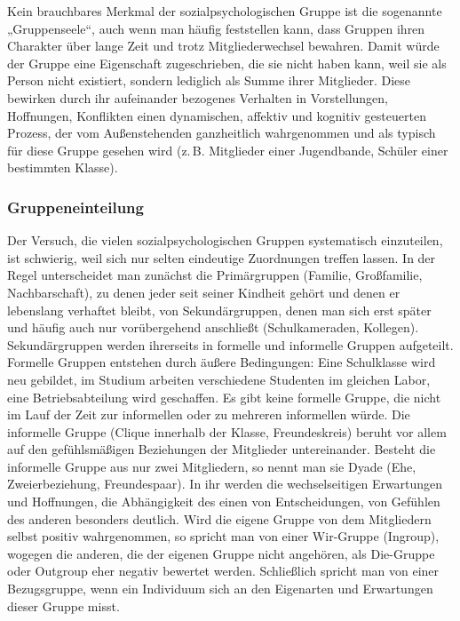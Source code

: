 \documentclass[12pt]{scrartcl}
\DeclareRobustCommand{\zB}{z.\,B.\xspace}
\begin{document}
Kein brauchbares Merkmal der sozialpsychologischen Gruppe ist die sogenannte
„Gruppenseele“, auch wenn man häufig feststellen kann, dass Gruppen ihren
Charakter über lange Zeit und trotz Mitgliederwechsel bewahren. Damit würde der
Gruppe eine Eigenschaft zugeschrieben, die sie nicht haben kann, weil sie als
Person nicht existiert, sondern lediglich als Summe ihrer Mitglieder. Diese
bewirken durch ihr aufeinander bezogenes Verhalten in Vorstellungen,
Hoffnungen, Konflikten einen dynamischen, affektiv und kognitiv gesteuerten
Prozess, der vom Außenstehenden ganzheitlich wahrgenommen und als typisch für
diese Gruppe gesehen wird (\zB Mitglieder einer Jugendbande, Schüler einer
bestimmten Klasse).

\subsubsection{Gruppeneinteilung}
Der Versuch, die vielen sozialpsychologischen Gruppen systematisch einzuteilen,
ist schwierig, weil sich nur selten eindeutige Zuordnungen treffen lassen. In
der Regel unterscheidet man zunächst die Primärgruppen (Familie, Großfamilie,
Nachbarschaft), zu denen jeder seit seiner Kindheit gehört und denen er
lebenslang verhaftet bleibt, von Sekundärgruppen, denen man sich erst später
und häufig auch nur vorübergehend anschließt (Schulkameraden, Kollegen).
Sekundärgruppen werden ihrerseits in formelle und informelle Gruppen
aufgeteilt. Formelle Gruppen entstehen durch äußere Bedingungen: Eine
Schulklasse wird neu gebildet, im Studium arbeiten verschiedene Studenten im
gleichen Labor, eine Betriebsabteilung wird geschaffen. Es gibt keine formelle
Gruppe, die nicht im Lauf der Zeit zur informellen oder zu mehreren informellen
würde. Die informelle Gruppe (Clique innerhalb der Klasse, Freundeskreis)
beruht vor allem auf den gefühlsmäßigen Beziehungen der Mitglieder
untereinander. Besteht die informelle Gruppe aus nur zwei Mitgliedern, so nennt
man sie Dyade (Ehe, Zweierbeziehung, Freundespaar). In ihr werden die
wechselseitigen Erwartungen und Hoffnungen, die Abhängigkeit des einen von
Entscheidungen, von Gefühlen des anderen besonders deutlich. Wird die eigene
Gruppe von dem Mitgliedern selbst positiv wahrgenommen, so spricht man von
einer Wir-Gruppe (Ingroup), wogegen die anderen, die der eigenen Gruppe nicht
angehören, als Die-Gruppe oder Outgroup eher negativ bewertet werden.
Schließlich spricht man von einer Bezugsgruppe, wenn ein Individuum sich an den
Eigenarten und Erwartungen dieser Gruppe misst.
\end{document}
